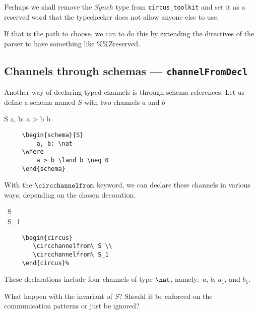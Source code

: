 \documentclass{article}
\newcommand{\grammar}[1]{\texttt{#1}}
\newcommand{\code}[1]{\textsf{#1}}
\begin{document}
%
\begin{issue}
    Perhaps we shall remove the $Synch$ type from \texttt{circus\_toolkit} and
    set it as a reserved word that the typechecker does not allow anyone else to
    use.

    If that is the path to choose, we can to do this by extending the
    directives of the parser to have something like \code{\%\%Zreserved}.
\end{issue}

\subsection{Channels through schemas --- \grammar{channelFromDecl}}

Another way of declaring typed channels is through schema references. Let us
define a schema named $S$ with two channels $a$ and $b$
%
\begin{schema}{S}
   a, b: \nat
\where
   a > b \land b 
\end{schema}
%
\begin{verbatim}
     \begin{schema}{S}
         a, b: \nat
     \where
         a > b \land b \neq 0
     \end{schema}
\end{verbatim}
%
With the $\circchannelfrom$ keyword, we can declare these channels in various
ways, depending on the chosen decoration.
%
\begin{circus}
   \circchannelfrom\ S \\
   \circchannelfrom\ S_1
\end{circus}%
%
\begin{verbatim}
     \begin{circus}
        \circchannelfrom\ S \\
        \circchannelfrom\ S_1
     \end{circus}%
\end{verbatim}
%
These declarations include four channels of type $\nat$, namely:~$a$, $b$,
$a_1$, and $b_1$.

%
\begin{issue}
  What happen with the invariant of $S$?
  Should it be enforced on the communication patterns or just be ignored?
\end{issue}
\end{document}
